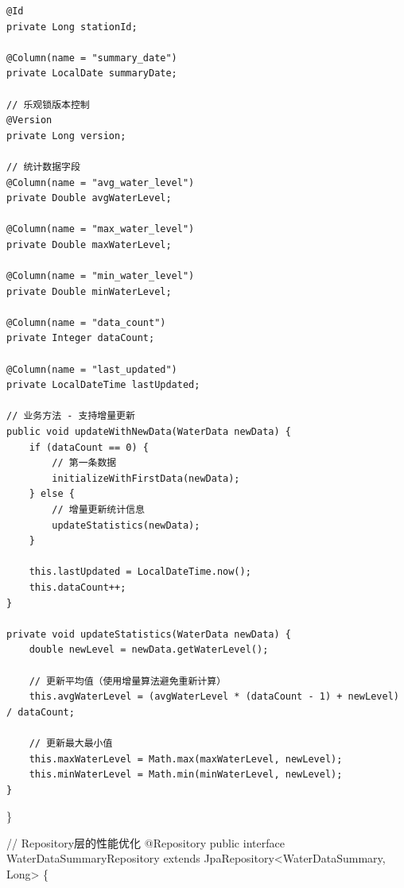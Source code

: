 \begin{verbatim}
@Id
private Long stationId;

@Column(name = "summary_date")
private LocalDate summaryDate;

// 乐观锁版本控制
@Version
private Long version;

// 统计数据字段
@Column(name = "avg_water_level")
private Double avgWaterLevel;

@Column(name = "max_water_level")
private Double maxWaterLevel;

@Column(name = "min_water_level") 
private Double minWaterLevel;

@Column(name = "data_count")
private Integer dataCount;

@Column(name = "last_updated")
private LocalDateTime lastUpdated;

// 业务方法 - 支持增量更新
public void updateWithNewData(WaterData newData) {
    if (dataCount == 0) {
        // 第一条数据
        initializeWithFirstData(newData);
    } else {
        // 增量更新统计信息
        updateStatistics(newData);
    }
    
    this.lastUpdated = LocalDateTime.now();
    this.dataCount++;
}

private void updateStatistics(WaterData newData) {
    double newLevel = newData.getWaterLevel();
    
    // 更新平均值（使用增量算法避免重新计算）
    this.avgWaterLevel = (avgWaterLevel * (dataCount - 1) + newLevel) / dataCount;
    
    // 更新最大最小值
    this.maxWaterLevel = Math.max(maxWaterLevel, newLevel);
    this.minWaterLevel = Math.min(minWaterLevel, newLevel);
}
\end{verbatim}

\}

// Repository层的性能优化 @Repository public interface WaterDataSummaryRepository extends JpaRepository\textless WaterDataSummary, Long\textgreater{} \{

